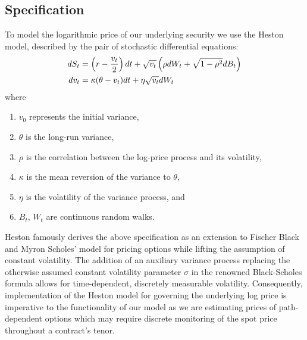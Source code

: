 \documentclass[11pt]{article}
\begin{document}
	\subsection{Specification}
		\label{sections:specification}
		To model the logarithmic price of our underlying security we use the Heston \cite{heston_1993_a} model, described by the pair of stochastic differential equations:
		\begin{align}
		    dS_t &= \left( r - \frac{v_t}{2} \right) dt + \sqrt{v_t} \left( \rho dW_t + \sqrt{1 - \rho^2} dB_t \right) \label{eq:hdXt} \\
		    dv_t &= \kappa (\theta - v_t) dt + \eta \sqrt{v_t} dW_t \hspace{1.8cm} \label{eq:hdvt}
		\end{align}
		where
		\begin{enumerate}
		    \item $v_0$ represents the initial variance,
		    \item $\theta$ is the long-run variance,
		    \item $\rho$ is the correlation between the log-price process and its volatility,
		    \item $\kappa$ is the mean reversion of the variance to $\theta$,
		    \item $\eta$ is the volatility of the variance process, and 
		    \item $B_{t}$, $W_{t}$ are continuous random walks.
		\end{enumerate}
		Heston \cite{heston_1993_a} famously derives the above specification as an extension to Fischer Black and Myron Scholes' \cite{black_1973_the} model for pricing options while lifting the assumption of constant volatility. The addition of an auxiliary variance process replacing the otherwise assumed constant volatility parameter $\sigma$ in the renowned Black-Scholes formula allows for time-dependent, discretely measurable volatility. Consequently, implementation of the Heston \cite{heston_1993_a} model for governing the underlying log price is imperative to the functionality of our model as we are estimating prices of path-dependent options which may require discrete monitoring of the spot price throughout a contract's tenor.
		
\end{document}
